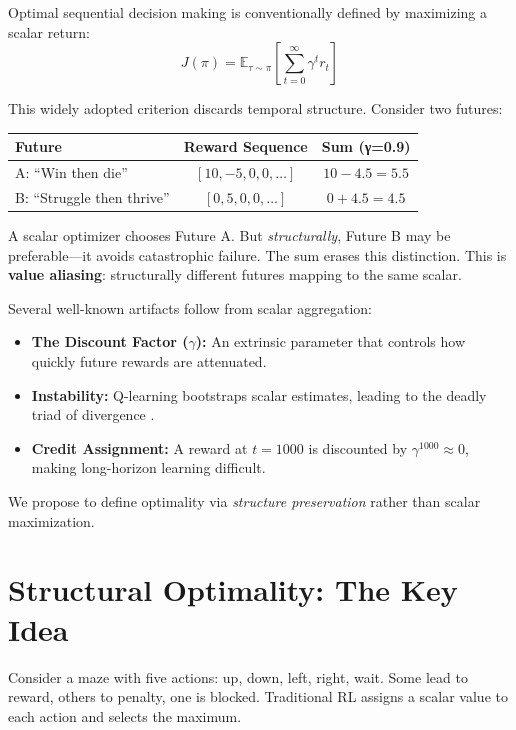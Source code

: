 \documentclass[9pt,a4paper]{article}
\theoremstyle{plain}
\theoremstyle{definition}
\theoremstyle{remark}
\begin{document}
Optimal sequential decision making is conventionally defined by maximizing a scalar return:
\[
J(\pi) = \mathbb{E}_{\tau \sim \pi} \left[ \sum_{t=0}^{\infty} \gamma^t r_t \right]
\]

This widely adopted criterion discards temporal structure. Consider two futures:

\begin{center}
\begin{tabular}{lcc}
\textbf{Future} & \textbf{Reward Sequence} & \textbf{Sum (γ=0.9)} \\
\hline
A: ``Win then die'' & $[10, -5, 0, 0, \ldots]$ & $10 - 4.5 = 5.5$ \\
B: ``Struggle then thrive'' & $[0, 5, 0, 0, \ldots]$ & $0 + 4.5 = 4.5$ \\
\end{tabular}
\end{center}

A scalar optimizer chooses Future A. But \emph{structurally}, Future B may be preferable---it avoids catastrophic failure. The sum erases this distinction. This is \textbf{value aliasing}: structurally different futures mapping to the same scalar.

Several well-known artifacts follow from scalar aggregation:
\begin{itemize}
\item \textbf{The Discount Factor ($\gamma$):} An extrinsic parameter that controls how quickly future rewards are attenuated.
\item \textbf{Instability:} Q-learning bootstraps scalar estimates, leading to the deadly triad of divergence \cite{Sutton2018}.
\item \textbf{Credit Assignment:} A reward at $t=1000$ is discounted by $\gamma^{1000} \approx 0$, making long-horizon learning difficult.
\end{itemize}

We propose to define optimality via \emph{structure preservation} rather than scalar maximization.


\section{Structural Optimality: The Key Idea}

Consider a maze with five actions: up, down, left, right, wait. Some lead to reward, others to penalty, one is blocked. Traditional RL assigns a scalar value to each action and selects the maximum.
\end{document}
